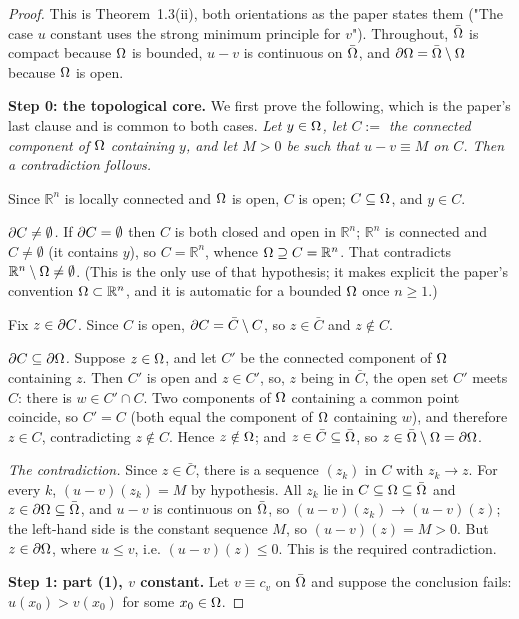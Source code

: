 \begin{proof}
This is Theorem~1.3(ii), both orientations as the paper states them ("The case $u$ constant
uses the strong minimum principle for $v$"). Throughout, $\bar{\Omega}$ is compact because $\Omega$
is bounded, $u-v$ is continuous on $\bar{\Omega}$, and $\partial\Omega=\bar{\Omega}\setminus\Omega$ because $\Omega$ is
open.

\medskip\noindent\textbf{Step 0: the topological core.} We first prove the following, which
is the paper's last clause and is common to both cases. \emph{Let $y\in\Omega$, let
$C:=$ the connected component of $\Omega$ containing $y$, and let $M>0$ be such that
$u-v\equiv M$ on $C$. Then a contradiction follows.}

Since $\mathbb R^{n}$ is locally connected and $\Omega$ is open, $C$ is open; $C\subseteq\Omega$,
and $y\in C$.

\emph{$\partial C\ne\emptyset$.} If $\partial C=\emptyset$ then $C$ is both closed and open in
$\mathbb R^{n}$; $\mathbb R^{n}$ is connected and $C\ne\emptyset$ (it contains $y$), so
$C=\mathbb R^{n}$, whence $\Omega\supseteq C=\mathbb R^{n}$. That contradicts
$\mathbb R^{n}\setminus\Omega\ne\emptyset$. (This is the only use of that hypothesis; it makes
explicit the paper's convention $\Omega\subset\mathbb R^{n}$, and it is automatic for a bounded
$\Omega$ once $n\ge1$.)

Fix $z\in\partial C$. Since $C$ is open, $\partial C=\bar C\setminus C$, so $z\in\bar C$ and $z\notin C$.

\emph{$\partial C\subseteq\partial\Omega$.} Suppose $z\in\Omega$, and let $C'$ be the connected component
of $\Omega$ containing $z$. Then $C'$ is open and $z\in C'$, so, $z$ being in $\bar C$, the open
set $C'$ meets $C$: there is $w\in C'\cap C$. Two components of $\Omega$ containing a common
point coincide, so $C'=C$ (both equal the component of $\Omega$ containing $w$), and therefore
$z\in C$, contradicting $z\notin C$. Hence $z\notin\Omega$; and $z\in\bar C\subseteq\bar{\Omega}$, so
$z\in\bar{\Omega}\setminus\Omega=\partial\Omega$.

\emph{The contradiction.} Since $z\in\bar C$, there is a sequence $(z_k)$ in $C$ with
$z_k\to z$. For every $k$, $(u-v)(z_k)=M$ by hypothesis. All $z_k$ lie in
$C\subseteq\Omega\subseteq\bar{\Omega}$ and $z\in\partial\Omega\subseteq\bar{\Omega}$, and $u-v$ is continuous on
$\bar{\Omega}$, so $(u-v)(z_k)\to(u-v)(z)$; the left-hand side is the constant sequence $M$, so
$(u-v)(z)=M>0$. But $z\in\partial\Omega$, where $u\le v$, i.e. $(u-v)(z)\le0$. This is the required
contradiction.

\medskip\noindent\textbf{Step 1: part (1), $v$ constant.} Let $v\equiv c_v$ on $\bar{\Omega}$ and
suppose the conclusion fails: $u(x_0)>v(x_0)$ for some $x_0\in\Omega$.


\end{proof}
